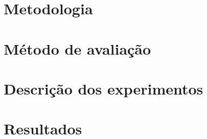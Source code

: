 \section{Metodologia}
\label{cha:metodologia}
	

\newpage

\section{Método de avaliação}
\label{cha:avaliacao}
	

\newpage

\section{Descrição dos experimentos}
\label{cha:experimentos}
	

\newpage

\section{Resultados}
\label{cha:resultados}
	

